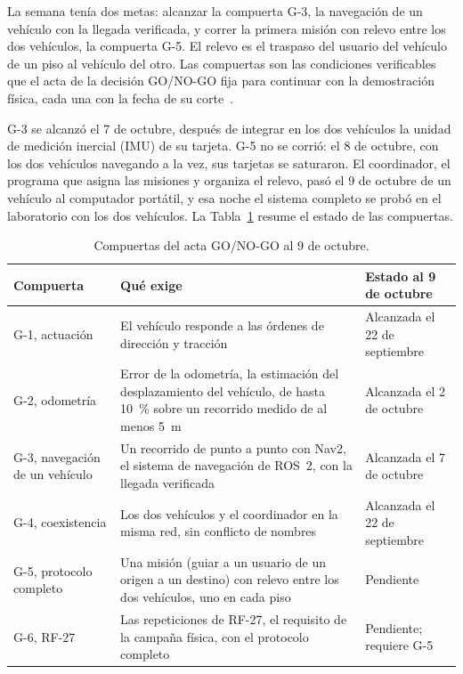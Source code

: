 \documentclass[12pt,letterpaper]{article}
\begin{document}
La semana tenía dos metas: alcanzar la compuerta G-3, la navegación de un vehículo con la llegada verificada, y correr la primera misión con relevo entre los dos vehículos, la compuerta G-5. El relevo es el traspaso del usuario del vehículo de un piso al vehículo del otro. Las compuertas son las condiciones verificables que el acta de la decisión GO/NO-GO fija para continuar con la demostración física, cada una con la fecha de su corte~\cite{acta}.

G-3 se alcanzó el 7 de octubre, después de integrar en los dos vehículos la unidad de medición inercial (IMU) de su tarjeta. G-5 no se corrió: el 8 de octubre, con los dos vehículos navegando a la vez, sus tarjetas se saturaron. El coordinador, el programa que asigna las misiones y organiza el relevo, pasó el 9 de octubre de un vehículo al computador portátil, y esa noche el sistema completo se probó en el laboratorio con los dos vehículos. La Tabla~\ref{tab:compuertas} resume el estado de las compuertas.

\begin{table}[H]
    \centering
    \small
    \caption{Compuertas del acta GO/NO-GO al 9 de octubre.}
    \label{tab:compuertas}
    \begin{tabular}{@{}p{3.4cm}p{6.6cm}p{4.0cm}@{}}
        \toprule
        \textbf{Compuerta} & \textbf{Qué exige} & \textbf{Estado al 9 de octubre} \\ \midrule
        G-1, actuación & El vehículo responde a las órdenes de dirección y tracción & Alcanzada el 22 de septiembre \\ \addlinespace
        G-2, odometría & Error de la odometría, la estimación del desplazamiento del vehículo, de hasta 10~\% sobre un recorrido medido de al menos 5~m & Alcanzada el 2 de octubre \\ \addlinespace
        G-3, navegación de un vehículo & Un recorrido de punto a punto con Nav2, el sistema de navegación de ROS~2, con la llegada verificada & Alcanzada el 7 de octubre \\ \addlinespace
        G-4, coexistencia & Los dos vehículos y el coordinador en la misma red, sin conflicto de nombres & Alcanzada el 22 de septiembre \\ \addlinespace
        G-5, protocolo completo & Una misión (guiar a un usuario de un origen a un destino) con relevo entre los dos vehículos, uno en cada piso & Pendiente \\ \addlinespace
        G-6, RF-27 & Las repeticiones de RF-27, el requisito de la campaña física, con el protocolo completo & Pendiente; requiere G-5 \\ \bottomrule
    \end{tabular}
\end{table}
\end{document}
